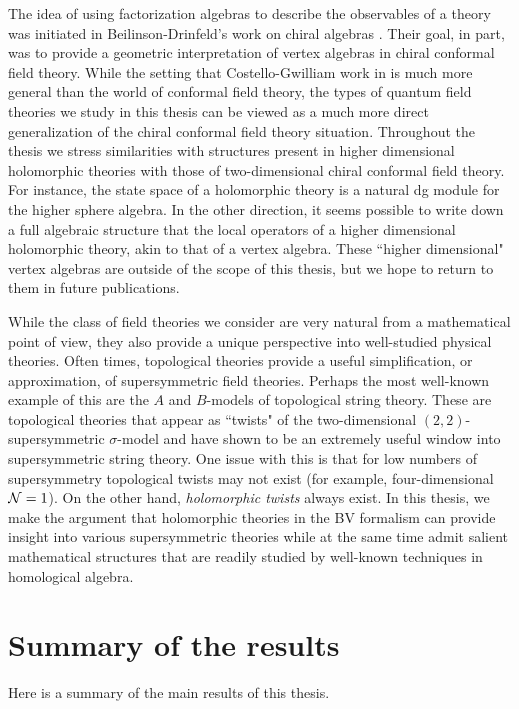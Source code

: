 The idea of using factorization algebras to describe the observables of a theory was initiated in Beilinson-Drinfeld's work on chiral algebras \cite{BD}. 
Their goal, in part, was to provide a geometric interpretation of vertex algebras in chiral conformal field theory. 
While the setting that Costello-Gwilliam work in is much more general than the world of conformal field theory, the types of quantum field theories we study in this thesis can be viewed as a much more direct generalization of the chiral conformal field theory situation. 
Throughout the thesis we stress similarities with structures present in higher dimensional holomorphic theories with those of two-dimensional chiral conformal field theory. 
For instance, the state space of a holomorphic theory is a natural dg module for the higher sphere algebra.   
In the other direction, it seems possible to write down a full algebraic structure that the local operators of a higher dimensional holomorphic theory, akin to that of a vertex algebra. 
These ``higher dimensional" vertex algebras are outside of the scope of this thesis, but we hope to return to them in future publications. 

While the class of field theories we consider are very natural from a mathematical point of view, they also provide a unique perspective into well-studied physical theories. 
Often times, topological theories provide a useful simplification, or approximation, of supersymmetric field theories. 
Perhaps the most well-known example of this are the $A$ and $B$-models of topological string theory.
These are topological theories that appear as ``twists" of the two-dimensional $(2,2)$-supersymmetric $\sigma$-model and have shown to be an extremely useful window into supersymmetric string theory. 
One issue with this is that for low numbers of supersymmetry topological twists may not exist (for example, four-dimensional $\mathcal N=1$).
On the other hand, {\em holomorphic twists} always exist. 
In this thesis, we make the argument that holomorphic theories in the BV formalism can provide insight into various supersymmetric theories while at the same time admit salient mathematical structures that are readily studied by well-known techniques in homological algebra.


\section{Summary of the results}

Here is a summary of the main results of this thesis.

